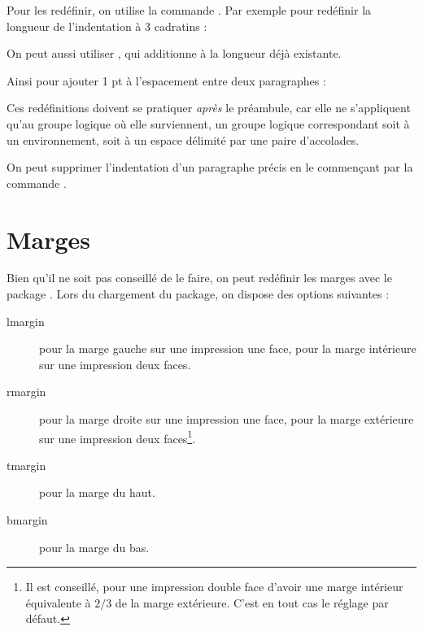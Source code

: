 Pour les redéfinir, on utilise la commande . Par exemple pour redéfinir la longueur de l'indentation à 3 cadratins :\label{setlength}

\begin{latexcode}
\setlength{\parindent}{3ex}
\end{latexcode}

On peut aussi utiliser , qui additionne  à la longueur déjà existante.

Ainsi pour ajouter 1 pt à l'espacement entre deux paragraphes :

\begin{latexcode}
\addtolength{\parskip}{1pt}
\end{latexcode}

Ces redéfinitions doivent se pratiquer \emph{après} le préambule, car elle ne s'appliquent qu'au groupe logique où elle surviennent, un groupe logique correspondant soit à un environnement, soit à un espace délimité par une paire d'accolades.

\begin{plusloins}
On peut supprimer l'indentation d'un paragraphe précis en le commençant par la commande .
\end{plusloins}

\section{Marges}

Bien qu'il ne soit pas conseillé de le faire, on peut redéfinir les marges avec le package . Lors du chargement du package, on dispose des options suivantes :
\begin{description}
\item[lmargin]pour la marge gauche sur une impression une face, pour la marge intérieure sur une impression deux faces.
\item[rmargin]pour la marge droite sur une impression une face, pour la marge extérieure sur une impression deux faces\footnote{Il est conseillé, pour une impression double face d'avoir une marge intérieur équivalente à $2/3$ de la marge extérieure. C'est en tout cas le réglage par défaut.}.
\item[tmargin]pour la marge du haut.
\item[bmargin]pour la marge du bas.
\end{description}

